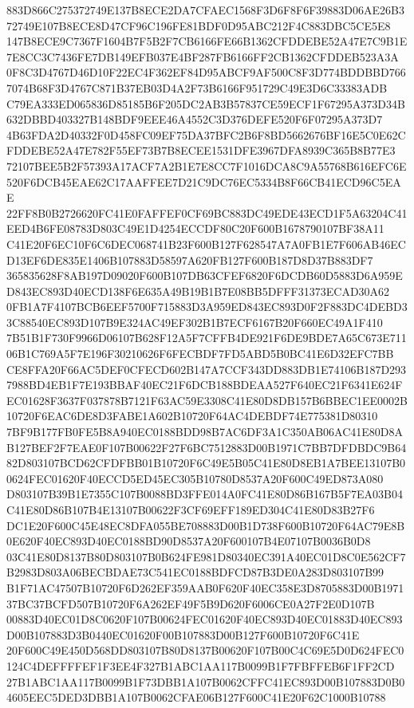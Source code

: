 \documentclass[UTF8,fontset=fandol,zihao=-4,a4paper]{ctexart}
\begin{document}
{{883D866C275372749E137B8ECE2DA7CFAEC1568F3D6F8F6F39883D06AE26B372749E107B8ECE8D47CF96C196FE81BDF0D95ABC212F4C883DBC5CE5E8
147B8ECE9C7367F1604B7F5B2F7CB6166FE66B1362CFDDEBE52A47E7C9B1E7E8CC3C7436FE7DB149EFB037E4BF287FB6166FF2CB1362CFDDEB523A3A
0F8C3D4767D46D10F22EC4F362EF84D95ABCF9AF500C8F3D774BDDBBD7667074B68F3D4767C871B37EB03D4A2F73B6166F951729C49E3D6C33383ADB
C79EA333ED065836D85185B6F205DC2AB3B57837CE59ECF1F67295A373D34B632DBBD403327B148BDF9EEE46A4552C3D376DEFE520F6F07295A373D7
4B63FDA2D40332F0D458FC09EF75DA37BFC2B6F8BD5662676BF16E5C0E62CFDDEBE52A47E782F55EF73B7B8ECEE1531DFE3967DFA8939C365B8B77E3
72107BEE5B2F57393A17ACF7A2B1E7E8CC7F1016DCA8C9A55768B616EFC6E520F6DCB45EAE62C17AAFFEE7D21C9DC76EC5334B8F66CB41ECD96C5EAE
22FF8B0B2726620FC41E0FAFFEF0CF69BC883DC49EDE43ECD1F5A63204C41EED4B6FE08783D803C49E1D4254ECCDF80C20F600B1678790107BF38A11
C41E20F6EC10F6C6DEC068741B23F600B127F628547A7A0FB1E7F606AB46ECD13EF6DE835E1406B107883D58597A620FB127F600B187D8D37B883DF7
365835628F8AB197D09020F600B107DB63CFEF6820F6DCDB60D5883D6A959ED843EC893D40ECD138F6E635A49B19B1B7E08BB5DFFF31373ECAD30A62
0FB1A7F4107BCB6EEF5700F715883D3A959ED843EC893D0F2F883DC4DEBD33C88540EC893D107B9E324AC49EF302B1B7ECF6167B20F660EC49A1F410
7B51B1F730F9966D06107B628F12A5F7CFFB4DE921F6DE9BDE7A65C673E71106B1C769A5F7E196F30210626F6FECBDF7FD5ABD5B0BC41E6D32EFC7BB
CE8FFA20F66AC5DEF0CFECD602B147A7CCF343DD883DB1E74106B187D2937988BD4EB1F7E193BBAF40EC21F6DCB188BDEAA527F640EC21F6341E624F
EC01628F3637F037878B7121F63AC59E3308C41E80D8DB157B6BBEC1EE0002B10720F6EAC6DE8D3FABE1A602B10720F64AC4DEBDF74E775381D80310
7BF9B177FB0FE5B8A940EC0188BDD98B7AC6DF3A1C350AB06AC41E80D8AB127BEF2F7EAE0F107B00622F27F6BC7512883D00B1971C7BB7DFDBDC9B64
82D803107BCD62CFDFBB01B10720F6C49E5B05C41E80D8EB1A7BEE13107B00624FEC01620F40ECCD5ED45EC305B10780D8537A20F600C49ED873A080
D803107B39B1E7355C107B0088BD3FFE014A0FC41E80D86B167B5F7EA03B04C41E80D86B107B4E13107B00622F3CF69EFF189ED304C41E80D83B27F6
DC1E20F600C45E48EC8DFA055BE708883D00B1D738F600B10720F64AC79E8B0E620F40EC893D40EC0188BD90D8537A20F600107B4E07107B0036B0D8
03C41E80D8137B80D803107B0B624FE981D80340EC391A40EC01D8C0E562CF7B2983D803A06BECBDAE73C541EC0188BDFCD87B3DE0A283D803107B99
B1F71AC47507B10720F6D262EF359AAB0F620F40EC358E3D8705883D00B197137BC37BCFD507B10720F6A262EF49F5B9D620F6006CE0A27F2E0D107B
00883D40EC01D8C0620F107B00624FEC01620F40EC893D40EC01883D40EC893D00B107883D3B0440EC01620F00B107883D00B127F600B10720F6C41E
20F600C49E450D568DD803107B80D8137B00620F107B00C4C69E5D0D624FEC0124C4DEFFFFEF1F3EE4F327B1ABC1AA117B0099B1F7FBFFEB6F1FF2CD
27B1ABC1AA117B0099B1F73DBB1A107B0062CFFC41EC893D00B107883D0B04605EEC5DED3DBB1A107B0062CFAE06B127F600C41E20F62C1000B10788
}}
\end{document}
